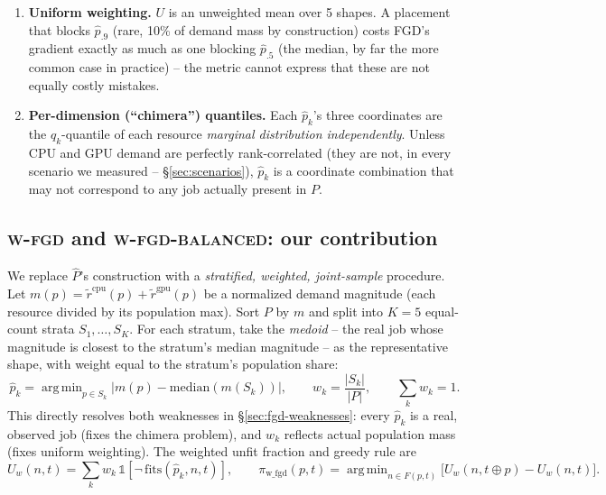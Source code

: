 \documentclass[11pt]{article}
\DeclareMathOperator*{\argmin}{arg\,min}
\begin{document}
\begin{enumerate}[leftmargin=1.4em]
\item \textbf{Uniform weighting.} $U$ is an unweighted mean over 5 shapes.
  A placement that blocks $\hat p_{.9}$ (rare, 10\% of demand mass by
  construction) costs FGD's gradient exactly as much as one blocking
  $\hat p_{.5}$ (the median, by far the more common case in practice) --
  the metric cannot express that these are not equally costly mistakes.
\item \textbf{Per-dimension (``chimera'') quantiles.} Each $\hat p_k$'s
  three coordinates are the $q_k$-quantile of each resource \emph{marginal
  distribution independently}. Unless CPU and GPU demand are perfectly
  rank-correlated (they are not, in every scenario we measured --
  \S\ref{sec:scenarios}), $\hat p_k$ is a coordinate combination that may
  not correspond to any job actually present in $P$.
\end{enumerate}

\subsection{\textsc{w-fgd} and \textsc{w-fgd-balanced}: our contribution}
\label{sec:wfgd}
We replace $\hat P$'s construction with a \emph{stratified, weighted,
joint-sample} procedure. Let $m(p) = \tilde r^{\text{cpu}}(p) + \tilde
r^{\text{gpu}}(p)$ be a normalized demand magnitude (each resource
divided by its population max). Sort $P$ by $m$ and split into $K=5$
equal-count strata $S_1,\dots,S_K$. For each stratum, take the
\emph{medoid} -- the real job whose magnitude is closest to the
stratum's median magnitude -- as the representative shape, with weight
equal to the stratum's population share:
\[
  \hat p_k = \argmin_{p \in S_k} \big| m(p) - \mathrm{median}(m(S_k)) \big|,
  \qquad
  w_k = \frac{|S_k|}{|P|}, \qquad \sum_k w_k = 1.
\]
This directly resolves both weaknesses in \S\ref{sec:fgd-weaknesses}: every
$\hat p_k$ is a real, observed job (fixes the chimera problem), and $w_k$
reflects actual population mass (fixes uniform weighting). The weighted
unfit fraction and greedy rule are
\[
  U_w(n,t) = \sum_{k} w_k\, \mathbb{1}[\neg\,\mathrm{fits}(\hat p_k, n, t)],
  \qquad
  \pi_{\text{w\_fgd}}(p,t) = \argmin_{n \in F(p,t)} \Big[U_w(n, t\oplus p) - U_w(n,t)\Big].
\]
\end{document}

